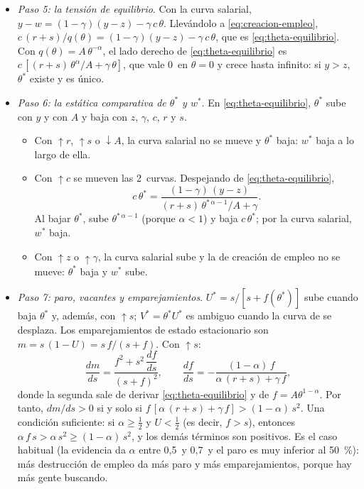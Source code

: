 \documentclass[11pt]{article}
\begin{document}
\begin{itemize}
\item \emph{Paso 5: la tensión de equilibrio}. Con la curva salarial, $y-w=(1-\gamma)(y-z)-\gamma\,c\,\theta$. Llevándolo a \eqref{eq:creacion-empleo}, $c\,(r+s)/q(\theta)=(1-\gamma)(y-z)-\gamma\,c\,\theta$, que es \eqref{eq:theta-equilibrio}. Con $q(\theta)=A\,\theta^{-\alpha}$, el lado derecho de \eqref{eq:theta-equilibrio} es $c\,[(r+s)\,\theta^{\alpha}/A+\gamma\,\theta]$, que vale 0~en $\theta=0$ y crece hasta infinito: si $y>z$, $\theta^*$ existe y es único.
\item \emph{Paso 6: la estática comparativa de $\theta^*$ y $w^*$}. En \eqref{eq:theta-equilibrio}, $\theta^*$ sube con $y$ y con $A$ y baja con $z$, $\gamma$, $c$, $r$ y $s$.
  \begin{itemize}
  \item Con $\uparrow r$, $\uparrow s$ o $\downarrow A$, la curva salarial no se mueve y $\theta^*$ baja: $w^*$ baja a lo largo de ella.
  \item Con $\uparrow c$ se mueven las 2~curvas. Despejando de \eqref{eq:theta-equilibrio},
    \begin{equation*}
    c\,\theta^*=\frac{(1-\gamma)\,(y-z)}{(r+s)\,\theta^{*\,\alpha-1}/A+\gamma}.
    \end{equation*}
    Al bajar $\theta^*$, sube $\theta^{*\,\alpha-1}$ (porque $\alpha<1$) y baja $c\,\theta^*$; por la curva salarial, $w^*$ baja.
  \item Con $\uparrow z$ o $\uparrow\gamma$, la curva salarial sube y la de creación de empleo no se mueve: $\theta^*$ baja y $w^*$ sube.
  \end{itemize}
\item \emph{Paso 7: paro, vacantes y emparejamientos}. $U^*=s/[s+f(\theta^*)]$ sube cuando baja $\theta^*$ y, además, con $\uparrow s$; $V^*=\theta^*U^*$ es ambiguo cuando la curva de  se desplaza. Los emparejamientos de estado estacionario son $m=s\,(1-U)=s\,f/(s+f)$. Con $\uparrow s$:
  \begin{equation*}
  \frac{dm}{ds}=\frac{f^{2}+s^{2}\,\dfrac{df}{ds}}{(s+f)^{2}},\qquad \frac{df}{ds}=-\frac{(1-\alpha)\,f}{\alpha\,(r+s)+\gamma\,f},
  \end{equation*}
  donde la segunda sale de derivar \eqref{eq:theta-equilibrio} y de $f=A\theta^{1-\alpha}$. Por tanto, $dm/ds>0$ si y solo si $f\,[\alpha\,(r+s)+\gamma\,f]>(1-\alpha)\,s^{2}$. Una condición suficiente: si $\alpha\geq\tfrac12$ y $U<\tfrac12$ (es decir, $f>s$), entonces $\alpha\,f\,s>\alpha\,s^{2}\geq(1-\alpha)\,s^{2}$, y los demás términos son positivos. Es el caso habitual (la evidencia da $\alpha$ entre 0,5~y 0,7~y el paro es muy inferior al 50~\%): más destrucción de empleo da más paro y más emparejamientos, porque hay más gente buscando. \findemo
\end{itemize}
\end{document}
